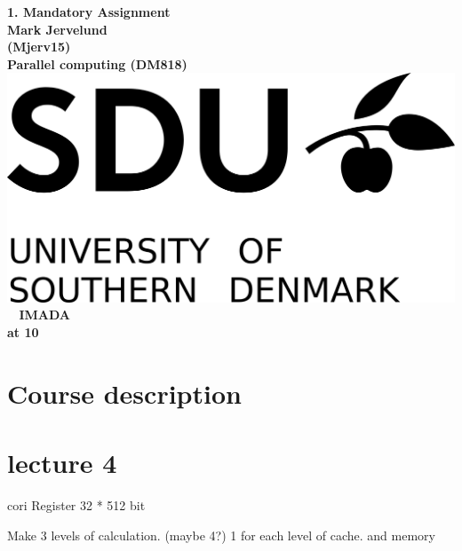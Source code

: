 \documentclass[a4paper,10pt,titlepage]{report}
\date{}
\begin{document}
\begin{titlepage}
\centering
    \vspace*{9\baselineskip}
    \huge
    \bfseries
    1. Mandatory Assignment \\
    \normalfont 
    Mark Jervelund  \\
    (Mjerv15) \\
	\huge    
    Parallel computing (DM818)  \\[4\baselineskip]
    \normalfont
	\includegraphics[scale=1]{SDU_Logo}
    \vfill\ 
    \vspace{5mm}
    IMADA \\

    \textbf{\datedate}  \bf{at 10} \\[2\baselineskip]
\end{titlepage}

\renewcommand{\thepage}{\roman{page}}%
\tableofcontents
\newpage
\setcounter{page}{1}
\renewcommand{\thepage}{\arabic{page}}
\section{Course description}

\newpage


\section{lecture 4}

cori
Register
32 * 512 bit


	Make 3 levels of calculation. (maybe 4?)
	1 for each level of cache.	and memory 
\end{document}
